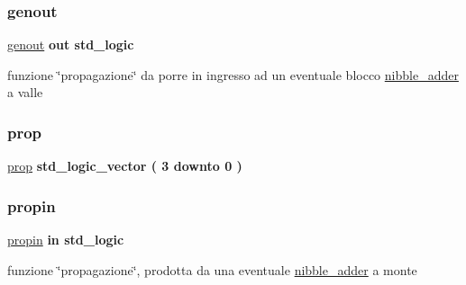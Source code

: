 \subsubsection{\texorpdfstring{genout}{genout}}
{\footnotesize\ttfamily \hyperlink{group___nibble_adder_ga068cd5c4d23e284cb942702252ed1491}{genout} {\bfseries \textcolor{vhdlchar}{out}\textcolor{vhdlchar}{ }} {\bfseries \textcolor{vhdlchar}{std\+\_\+logic}\textcolor{vhdlchar}{ }} \hspace{0.3cm}{\ttfamily [Port]}}

funzione \char`\"{}propagazione\char`\"{} da porre in ingresso ad un eventuale blocco \hyperlink{classnibble__adder}{nibble\+\_\+adder} a valle \mbox{\label{group___nibble_adder_ga3abd8d433ff039baabc0c6fc2126578b}} 
\subsubsection{\texorpdfstring{prop}{prop}}
{\footnotesize\ttfamily \hyperlink{group___nibble_adder_ga3abd8d433ff039baabc0c6fc2126578b}{prop} {\bfseries \textcolor{vhdlchar}{std\+\_\+logic\+\_\+vector}\textcolor{vhdlchar}{ }\textcolor{vhdlchar}{(}\textcolor{vhdlchar}{ }\textcolor{vhdlchar}{ } \textcolor{vhdldigit}{3} \textcolor{vhdlchar}{ }\textcolor{vhdlchar}{downto}\textcolor{vhdlchar}{ }\textcolor{vhdlchar}{ } \textcolor{vhdldigit}{0} \textcolor{vhdlchar}{ }\textcolor{vhdlchar}{)}\textcolor{vhdlchar}{ }} \hspace{0.3cm}{\ttfamily [Signal]}}

\mbox{\label{group___nibble_adder_ga422e8e7ee01fc7ac7b7390cd2ad8c87b}} 
\subsubsection{\texorpdfstring{propin}{propin}}
{\footnotesize\ttfamily \hyperlink{group___nibble_adder_ga422e8e7ee01fc7ac7b7390cd2ad8c87b}{propin} {\bfseries \textcolor{vhdlchar}{in}\textcolor{vhdlchar}{ }} {\bfseries \textcolor{vhdlchar}{std\+\_\+logic}\textcolor{vhdlchar}{ }} \hspace{0.3cm}{\ttfamily [Port]}}



funzione \char`\"{}propagazione\char`\"{}, prodotta da una eventuale \hyperlink{classnibble__adder}{nibble\+\_\+adder} a monte 

